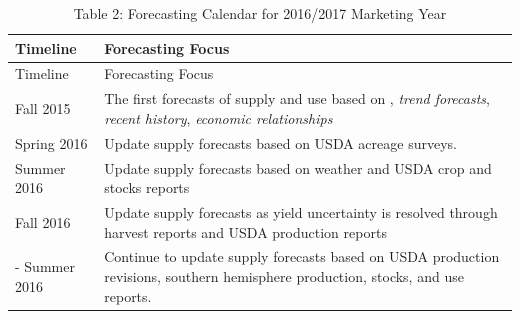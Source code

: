 \documentclass[]{book}
\theoremstyle{definition}
\theoremstyle{definition}
\theoremstyle{remark}
\begin{document}
\begin{longtable}[]{@{}ll@{}}
\caption{Table 2: Forecasting Calendar for 2016/2017 Marketing
Year}\tabularnewline
\toprule
\begin{minipage}[b]{0.19\columnwidth}\raggedright\strut
Timeline\strut
\end{minipage} & \begin{minipage}[b]{0.75\columnwidth}\raggedright\strut
Forecasting Focus\strut
\end{minipage}\tabularnewline
\midrule
\endfirsthead
\toprule
\begin{minipage}[b]{0.19\columnwidth}\raggedright\strut
Timeline\strut
\end{minipage} & \begin{minipage}[b]{0.75\columnwidth}\raggedright\strut
Forecasting Focus\strut
\end{minipage}\tabularnewline
\midrule
\endhead
\begin{minipage}[t]{0.19\columnwidth}\raggedright\strut
Fall 2015\strut
\end{minipage} & \begin{minipage}[t]{0.75\columnwidth}\raggedright\strut
The first forecasts of supply and use based on , \emph{trend forecasts},
\emph{recent history}, \emph{economic relationships}\strut
\end{minipage}\tabularnewline
\begin{minipage}[t]{0.19\columnwidth}\raggedright\strut
Spring 2016\strut
\end{minipage} & \begin{minipage}[t]{0.75\columnwidth}\raggedright\strut
Update supply forecasts based on USDA acreage surveys.\strut
\end{minipage}\tabularnewline
\begin{minipage}[t]{0.19\columnwidth}\raggedright\strut
Summer 2016\strut
\end{minipage} & \begin{minipage}[t]{0.75\columnwidth}\raggedright\strut
Update supply forecasts based on weather and USDA crop and stocks
reports\strut
\end{minipage}\tabularnewline
\begin{minipage}[t]{0.19\columnwidth}\raggedright\strut
Fall 2016\strut
\end{minipage} & \begin{minipage}[t]{0.75\columnwidth}\raggedright\strut
Update supply forecasts as yield uncertainty is resolved through harvest
reports and USDA production reports\strut
\end{minipage}\tabularnewline
\begin{minipage}[t]{0.19\columnwidth}\raggedright\strut
- Summer 2016\strut
\end{minipage} & \begin{minipage}[t]{0.75\columnwidth}\raggedright\strut
Continue to update supply forecasts based on USDA production revisions,
southern hemisphere production, stocks, and use reports.\strut
\end{minipage}\tabularnewline
\bottomrule
\end{longtable}
\end{document}
